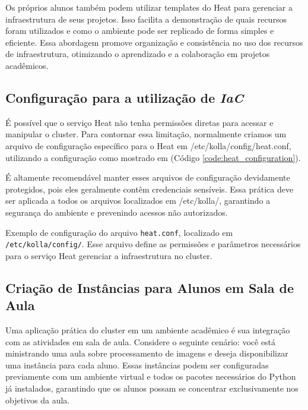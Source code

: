 Os próprios alunos também podem utilizar templates do Heat para gerenciar a infraestrutura de seus projetos. Isso facilita a demonstração de quais recursos foram utilizados e como o ambiente pode ser replicado de forma simples e eficiente. Essa abordagem promove organização e consistência no uso dos recursos de infraestrutura, otimizando o aprendizado e a colaboração em projetos acadêmicos.

\subsection{Configuração para a utilização de \textit{IaC}}
É possível que o serviço Heat não tenha permissões diretas para acessar e manipular o cluster. Para contornar essa limitação, normalmente criamos um arquivo de configuração específico para o Heat em /etc/kolla/config/heat.conf, utilizando a configuração como mostrado em (Código \ref{code:heat_configuration}).

É altamente recomendável manter esses arquivos de configuração devidamente protegidos, pois eles geralmente contêm credenciais sensíveis. Essa prática deve ser aplicada a todos os arquivos localizados em /etc/kolla/, garantindo a segurança do ambiente e prevenindo acessos não autorizados.


\begin{listing}[h!]
    \noindent{}  
  \caption{Exemplo de configuração do arquivo \texttt{heat.conf}, localizado em \texttt{/etc/kolla/config/}. Esse arquivo define as permissões e parâmetros necessários para o serviço Heat gerenciar a infraestrutura no cluster.}
  \label{code:heat_configuration}
\end{listing}


\subsection{Criação de Instâncias para Alunos em Sala de Aula}

Uma aplicação prática do cluster em um ambiente acadêmico é sua integração com as atividades em sala de aula. Considere o seguinte cenário: você está ministrando uma aula sobre processamento de imagens e deseja disponibilizar uma instância para cada aluno. Essas instâncias podem ser configuradas previamente com um ambiente virtual e todos os pacotes necessários do Python já instalados, garantindo que os alunos possam se concentrar exclusivamente nos objetivos da aula.

